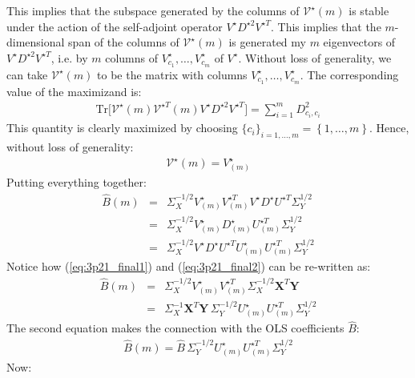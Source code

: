 This implies that the subspace generated by the columns of $\mathcal{V} ^{\star}(m)$ is stable under the action of the self-adjoint operator $V ^{\star}D ^{\star 2} V ^{\star T}$. This implies that the $m$-dimensional span of the columns of $\mathcal{V} ^{\star}(m)$ is generated my $m$ eigenvectors of $V ^{\star}D ^{\star 2} V ^{\star T}$, i.e. by $m$ columns of $V ^{\star}_{c_1}, \ldots, V ^{\star}_{c_m}$ of $V ^{\star}$. Without loss of generality, we can take $\mathcal{V} ^{\star}(m)$ to be the matrix with columns $V ^{\star}_{c_1}, \ldots, V ^{\star}_{c_m}$. The corresponding value of the maximizand is:
\begin{eqnarray*}
\textrm{Tr} \Big[ \mathcal{V}^{\star}(m) \mathcal{V} ^{\star T}(m) V ^{\star} D ^{\star 2} V ^{\star T} \Big] = \sum_{i = 1}^{m} D_{c_i, c_i}^2
\end{eqnarray*}
This quantity is clearly maximized by choosing $\{c_i\}_{i=1, \ldots, m} = \left\{ 1, \ldots, m \right\}$. Hence, without loss of generality:
\begin{eqnarray}
\mathcal{V} ^{\star}(m) = V ^{\star}_{(m)}
\end{eqnarray}
Putting everything together:
\begin{eqnarray} \label{eq:3p21_final1}
\hat{B}(m) & = & \Sigma_X ^{-1/2} V ^{\star}_{(m)} V ^{\star T}_{(m)} V ^{\star} D ^{\star} U ^{\star T} \Sigma_Y^{1/2} \\
& = & \Sigma_X ^{-1/2} V ^{\star}_{(m)} D ^{\star}_{(m)} U ^{\star T}_{(m)} \Sigma_Y^{1/2}\\
\label{eq:3p21_final2}
& = & \Sigma_X ^{-1/2} V ^{\star} D ^{\star} U ^{\star T} U ^{\star}_{(m)}U ^{\star T}_{(m)}  \Sigma_Y^{1/2}
\end{eqnarray}
Notice how (\ref{eq:3p21_final1}) and (\ref{eq:3p21_final2}) can be re-written as:
\begin{eqnarray} \label{eq:3p21_final}
\hat{B}(m) & = & \Sigma_X ^{-1/2} V ^{\star}_{(m)} V ^{\star T}_{(m)} \Sigma_X^{-1/2} \mathbf{X}^T \mathbf{Y}\\
 & = & \Sigma_X^{-1}\mathbf{X}^T \mathbf{Y}\,\Sigma_Y^{-1/2} U ^{\star}_{(m)}U ^{\star T}_{(m)}  \Sigma_Y^{1/2}
\end{eqnarray}
The second equation makes the connection with the OLS coefficients $\hat{B}$:
\begin{eqnarray} \label{eq:3p21_e4}
\hat{B}(m) = \hat{B}\, \Sigma_Y^{-1/2} U ^{\star}_{(m)}U ^{\star T}_{(m)}  \Sigma_Y^{1/2}
\end{eqnarray}
Now:
